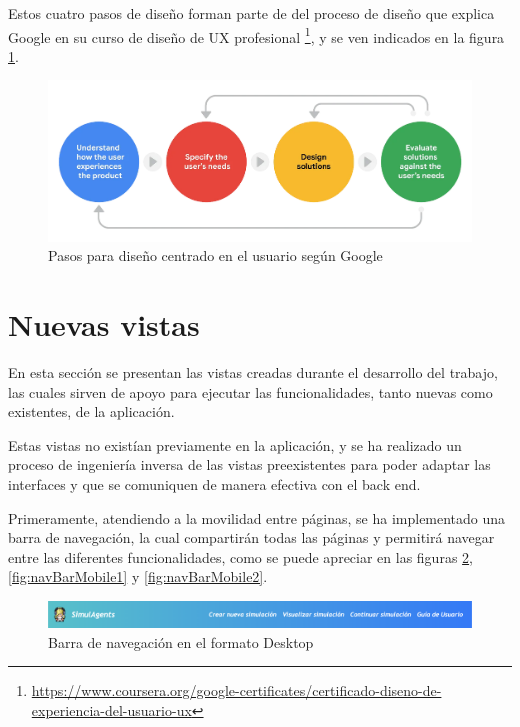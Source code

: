 Estos cuatro pasos de diseño forman parte de del proceso de diseño que explica Google en su curso de diseño de UX profesional \footnote{\url{https://www.coursera.org/google-certificates/certificado-diseno-de-experiencia-del-usuario-ux}}, y se ven indicados en la figura \ref{fig:pasosDisenoUsuario}.

\begin{figure}[H]
	\centering
	\includegraphics[width = 1\textwidth]{Imagenes/Vectorial/pasos_DCU.png}
	\caption{Pasos para diseño centrado en el usuario según Google}
	\label{fig:pasosDisenoUsuario}
\end{figure}

\section{Nuevas vistas}

En esta sección se presentan las vistas creadas durante el desarrollo del trabajo, las cuales sirven de apoyo para ejecutar las funcionalidades, tanto nuevas como existentes, de la aplicación.

Estas vistas no existían previamente en la aplicación, y se ha realizado un proceso de ingeniería inversa de las vistas preexistentes para poder adaptar las interfaces y que se comuniquen de manera efectiva con el back end.

Primeramente, atendiendo a la movilidad entre páginas, se ha implementado una barra de navegación, la cual compartirán todas las páginas y permitirá navegar entre las diferentes funcionalidades, como se puede apreciar en las figuras \ref{fig:navBarDesktop}, \ref{fig:navBarMobile1} y \ref{fig:navBarMobile2}.

\begin{figure}[H]
	\centering
	\includegraphics[width = 1\textwidth]{Imagenes/Vectorial/navBarDesktop.png}
	\caption{Barra de navegación en el formato Desktop}
	\label{fig:navBarDesktop}
\end{figure}

